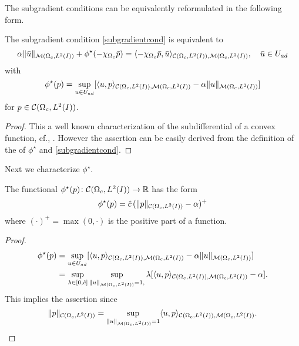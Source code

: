 The subgradient conditions can be equivalently reformulated in the following form.
\begin{proposition}\label{prop:equivoc}
The subgradient condition \eqref{subgradientcond} is equivalent to
\begin{equation}\label{equivoc}
\alpha \|\bar u\|_{\M}+\phi^{\star}(-\chi_{\Omega_c}\bar p)=\langle -\chi_{\Omega_c}\bar p,\bar u\rangle_{\C,\M},\quad \bar u\in U_{ad}
\end{equation}
with
\[
\phi^{\star}(p)=\sup_{u\in U_{ad}}[\langle u,p\rangle_{\mathcal{C}(\Omega_c, L^{2}(I)),\mathcal{M}(\Omega_c, L^{2}(I))}-\alpha \|u\|_{\mathcal{M}(\Omega_c, L^{2}(I))}]
\]
for $p\in \mathcal{C}(\Omega_c, L^{2}(I))$.
\end{proposition}
\begin{proof}
This a well known characterization of the subdifferential of a convex function, cf., \cite{EkelandTemam99}.  However the assertion can be easily derived from the definition of the of $\phi^\star$ and \eqref{subgradientcond}.
\qquad \end{proof}

Next we characterize $\phi^\star.$
\begin{lemma}\label{lem:phistar}
The functional $\phi^{\star}(p)\colon \mathcal{C}(\Omega_c, L^{2}(I))\rightarrow \mathbb R$ has the form
\[
\phi^{\star}(p)=\hat c\,(\|p\|_{\mathcal{C}(\Omega_c, L^{2}(I))}-\alpha)^+
\]
where $(\cdot)^+ = \operatorname{max}(0,\cdot)$ is the positive part of a function.
\end{lemma}
\begin{proof}
\begin{align*}
\phi^{\star}(p)&=\sup_{u\in U_{ad}}[\langle u,p\rangle_{\mathcal{C}(\Omega_c, L^{2}(I)),\mathcal{M}(\Omega_c, L^{2}(I))}-\alpha \|u\|_{\mathcal{M}(\Omega_c, L^{2}(I))}]\\
&=\sup_{\lambda\in [0,\hat c]}\sup_{\|u\|_{\mathcal{M}(\Omega_c, L^{2}(I))}=1,}\lambda[\langle u,p\rangle_{\mathcal{C}(\Omega_c, L^{2}(I)),\mathcal{M}(\Omega_c, L^{2}(I))}-\alpha].
\end{align*}
This implies the assertion since \[\|p\|_{\mathcal{C}(\Omega_c, L^{2}(I))}=\sup_{\|u\|_{\mathcal{M}(\Omega_c, L^{2}(I))}=1}\langle u,p\rangle_{\mathcal{C}(\Omega_c, L^{2}(I)),\mathcal{M}(\Omega_c, L^{2}(I))}.\]
\qquad\end{proof}

